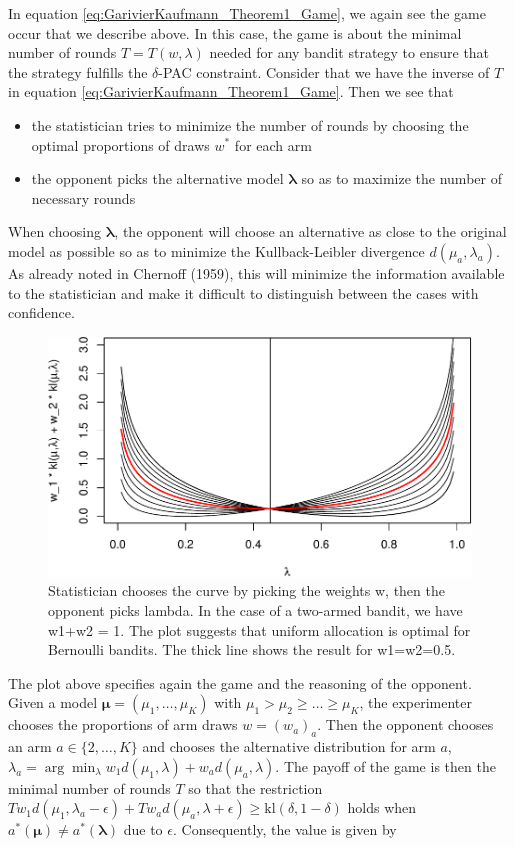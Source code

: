 \documentclass[12pt,]{article}
\providecommand{\tightlist}{%
  \setlength{\itemsep}{0pt}\setlength{\parskip}{0pt}}
\begin{document}
In equation \eqref{eq:GarivierKaufmann_Theorem1_Game}, we again see the
game occur that we describe above. In this case, the game is about the
minimal number of rounds \(T = T(w,\lambda)\) needed for any bandit
strategy to ensure that the strategy fulfills the \(\delta\)-PAC
constraint. Consider that we have the inverse of \(T\) in equation
\eqref{eq:GarivierKaufmann_Theorem1_Game}. Then we see that

\begin{itemize}
\tightlist
\item
  the statistician tries to minimize the number of rounds by choosing
  the optimal proportions of draws \(w^*\) for each arm
\item
  the opponent picks the alternative model \(\bm{\lambda}\) so as to
  maximize the number of necessary rounds
\end{itemize}

When choosing \(\bm{\lambda}\), the opponent will choose an alternative
as close to the original model as possible so as to minimize the
Kullback-Leibler divergence \(d(\mu_a, \lambda_a)\). As already noted in
Chernoff (1959), this will minimize the information available to the
statistician and make it difficult to distinguish between the cases with
confidence.

\begin{figure}[htbp]
\centering
\includegraphics{Pure_Exploration_files/figure-latex/unnamed-chunk-1-1.pdf}
\caption{Statistician chooses the curve by picking the weights w, then
the opponent picks lambda. In the case of a two-armed bandit, we have
w1+w2 = 1. The plot suggests that uniform allocation is optimal for
Bernoulli bandits. The thick line shows the result for w1=w2=0.5.}
\end{figure}

The plot above specifies again the game and the reasoning of the
opponent. Given a model \(\bm{\mu} = (\mu_1, \dots, \mu_K)\) with
\(\mu_1 > \mu_2 \geq \dots \geq \mu_K\), the experimenter chooses the
proportions of arm draws \(w = (w_a)_a\). Then the opponent chooses an
arm \(a \in \{2, \dots, K\}\) and chooses the alternative distribution
for arm \(a\),
\(\lambda_a = \arg \min_{\lambda} w_1 d(\mu_1, \lambda) + w_a d(\mu_a, \lambda)\).
The payoff of the game is then the minimal number of rounds \(T\) so
that the restriction
\(Tw_1 d(\mu_1, \lambda_a - \epsilon) + Tw_a d(\mu_a, \lambda + \epsilon) \geq \text{kl}(\delta, 1-\delta)\)
holds when \(a^*(\bm{\mu}) \neq a^*(\bm{\lambda})\) due to \(\epsilon\).
Consequently, the value is given by
\end{document}
